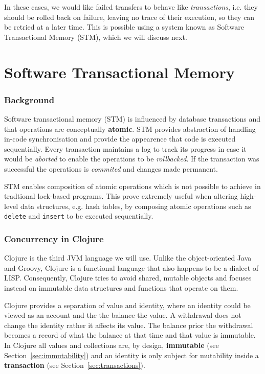 \documentclass[a4paper,12pt]{kth-mag}
\begin{document}
In these cases, we would like failed transfers to behave like \textit{transactions}, i.e. they should be rolled back on failure, leaving no trace of their execution, so they can be retried at a later time. This is possible using a system known as Software Transactional Memory (STM), which we will discuss next.

\part{ Software Transactional Memory}

\section{Background}
Software transactional memory (STM) is influenced by database transactions and that operations are conceptually \textbf{atomic}. STM provides abstraction of handling in-code synchronisation and provide the appearence that code is executed sequentially. Every transaction maintains a log to track its progress in case it would be \textit{aborted} to enable the operations to be \textit{rollbacked}. If the transaction was successful the operations is \textit{commited} and changes made permanent.

STM enables composition of atomic operations\cite{cmt} which is not possible to achieve in tradtional lock-based programs. This prove extremely useful when altering high-level data structures, e.g. hash tables, by composing atomic operations such as \texttt{delete} and \texttt{insert} to be executed sequentially. 

\section{Concurrency in Clojure}
Clojure is the third JVM language we will use. Unlike the object-oriented Java and Groovy, Clojure is a functional language that also happens to be a dialect of LISP.  Consequently, Clojure tries to avoid shared, mutable objects and focuses instead on immutable data structures and functions that operate on them.

Clojure provides a separation of value and identity, where an identity could be viewed as an account and the the balance the value. A withdrawal does not change the identity rather it affects its value. The balance prior the withdrawal becomes a record of what the balance at that time and that value is immutable. In Clojure all values and collections are, by design, \textbf{immutable} (see Section~\ref{sec:immutability}) and an identity is only subject for mutability inside a \textbf{transaction} (see Section~\ref{sec:transactions}).
\end{document}
